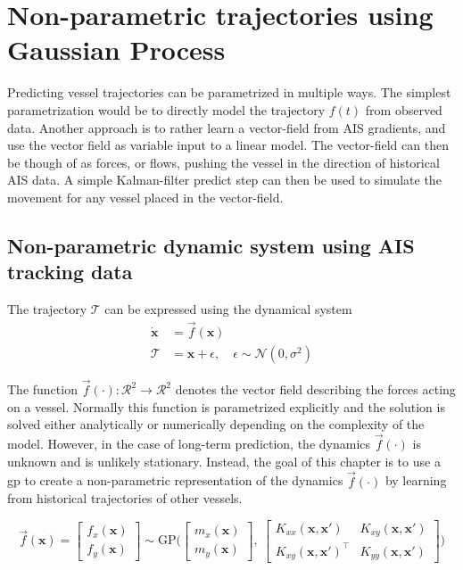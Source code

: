 \chapter{Non-parametric trajectories using Gaussian Process}\label{chap:impl}
Predicting vessel trajectories can be parametrized in multiple ways. The simplest parametrization would be to directly model the trajectory $f(t)$ from observed data. Another approach is to rather learn a vector-field from AIS gradients, and use the vector field as variable input to a linear model. The vector-field can then be though of as forces, or flows, pushing the vessel in the direction of historical AIS data. A simple Kalman-filter predict step can then be used to simulate the movement for any vessel placed in the vector-field. 


\section{Non-parametric dynamic system using AIS tracking data}
The trajectory $\mathcal{T}$ can be expressed using the dynamical system
\begin{subequations}
\begin{align}
    \dot{\boldsymbol{x}} &= \vec{f}(\boldsymbol{x})\\
    \mathcal{T} &= \boldsymbol{x} + \epsilon, \quad \epsilon \sim \mathcal{N}(0, \sigma^2)
\end{align}
\end{subequations}

The function $\vec{f}(\cdot): \mathcal{R}^2 \to \mathcal{R}^2$ denotes the vector field describing the forces acting on a vessel. Normally this function is parametrized explicitly and the solution is solved either analytically or numerically depending on the complexity of the model. However, in the case of long-term prediction, the dynamics $\vec{f}(\cdot)$ is unknown and is unlikely stationary. Instead, the goal of this chapter is to use a \acrshort{gp} to create a non-parametric representation of the dynamics $\vec{f}(\cdot)$ by learning from historical trajectories of other vessels.

\begin{equation}\label{eq:gp_vec_field}
    \vec{f}(\boldsymbol{x}) = \begin{bmatrix} f_x (\boldsymbol{x})\\ f_y (\boldsymbol{x})\end{bmatrix} \sim \text{GP} \big(\begin{bmatrix} m_x(\boldsymbol{x})\\m_y(\boldsymbol{x})\end{bmatrix}, \ \begin{bmatrix}
    K_{xx}(\boldsymbol{x}, \boldsymbol{x}') & K_{xy}(\boldsymbol{x}, \boldsymbol{x}') \\ K_{xy}(\boldsymbol{x}, \boldsymbol{x}')^\intercal & K_{yy}(\boldsymbol{x}, \boldsymbol{x}')
    \end{bmatrix}\big) 
\end{equation}

